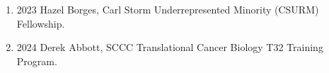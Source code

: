 \begin{enumerate}
[leftmargin=!,
 labelindent=0pt,
 itemindent=-66pt,
 label=\textbullet]

\item 2023
\hspace{8pt}
Hazel Borges, Carl Storm Underrepresented Minority (CSURM) Fellowship. \\

\item 2024
\hspace{8pt}
Derek Abbott, SCCC Translational Cancer Biology T32 Training Program. \\

\end{enumerate}


